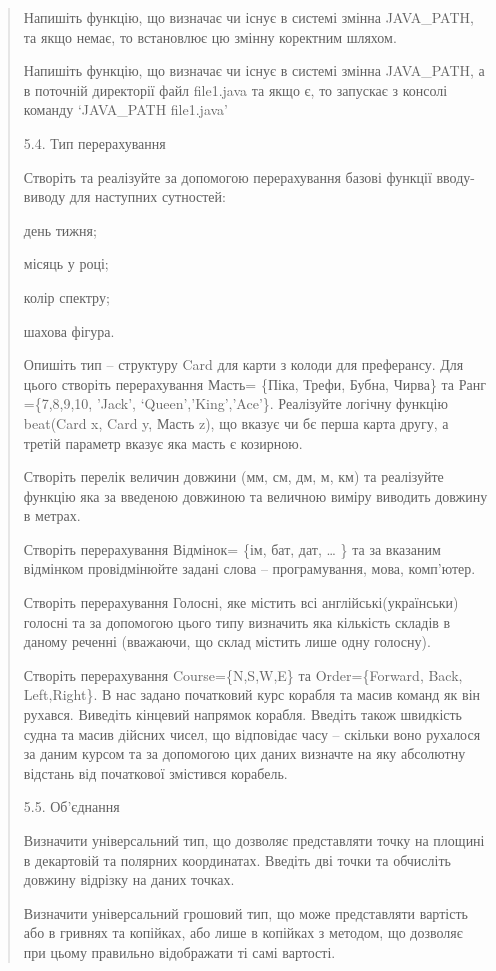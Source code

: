 \documentclass[]{article}
\begin{document}
\begin{quote}
Напишіть функцію, що визначає чи існує в системі змінна JAVA\_PATH, та
якщо немає, то встановлює цю змінну коректним шляхом.

Напишіть функцію, що визначає чи існує в системі змінна JAVA\_PATH, а в
поточній директорії файл file1.java та якщо є, то запускає з консолі
команду `JAVA\_PATH file1.java'

5.4. Тип перерахування

Створіть та реалізуйте за допомогою перерахування базові функції
вводу-виводу для наступних сутностей:

день тижня;

місяць у році;

колір спектру;

шахова фігура.

Опишіть тип -- структуру Card для карти з колоди для преферансу. Для
цього створіть перерахування Масть= \{Піка, Трефи, Бубна, Чирва\} та
Ранг =\{7,8,9,10, 'Jack', `Queen','King','Ace'\}. Реалізуйте логічну
функцію beat(Card x, Card y, Масть z), що вказує чи бє перша карта
другу, а третій параметр вказує яка масть є козирною.

\protect\hypertarget{_Hlk48906187}{}{}Створіть перелік величин довжини
(мм, см, дм, м, км) та реалізуйте функцію яка за введеною довжиною та
величною виміру виводить довжину в метрах.

Створіть перерахування Відмінок= \{ім, бат, дат, \ldots{} \} та за
вказаним відмінком провідмінюйте задані слова -- програмування, мова,
комп'ютер.

Створіть перерахування Голосні, яке містить всі англійські(українськи)
голосні та за допомогою цього типу визначить яка кількість складів в
даному реченні (вважаючи, що склад містить лише одну голосну).

Створіть перерахування Course=\{N,S,W,E\} та Order=\{Forward, Back,
Left,Right\}. В нас задано початковий курс корабля та масив команд як
він рухався. Виведіть кінцевий напрямок корабля. Введіть також швидкість
судна та масив дійсних чисел, що відповідає часу -- скільки воно
рухалося за даним курсом та за допомогою цих даних визначте на яку
абсолютну відстань від початкової змістився корабель.

5.5. Об'єднання

Визначити універсальний тип, що дозволяє представляти точку на площині в
декартовій та полярних координатах. Введіть дві точки та обчисліть
довжину відрізку на даних точках.

Визначити універсальний грошовий тип, що може представляти вартість або
в гривнях та копійках, або лише в копійках з методом, що дозволяє при
цьому правильно відображати ті самі вартості.


\end{quote}
\end{document}
